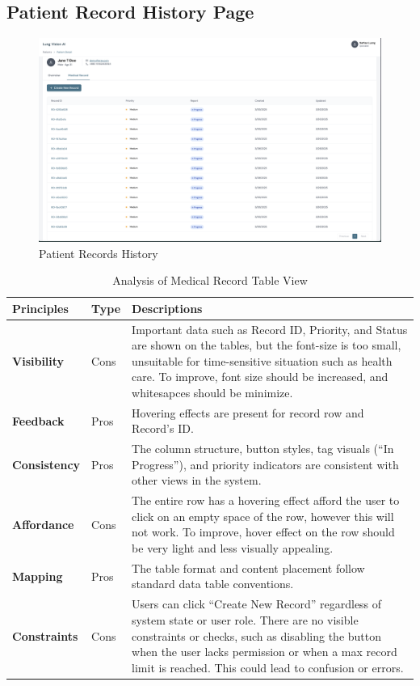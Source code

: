 \documentclass[12pt, titlepage]{article}
\begin{document}
\newpage
\subsection{Patient Record History Page}
  \begin{figure}[ht!] 
    \centering
    \includegraphics[scale=0.25]{../../assets/patient_records.png}
    \caption{Patient Records History}
    \label{fig:patient_records}
  \end{figure}

\begin{table}[h!]
    \centering
    \begin{tabular}{|p{2.5cm}|p{1.5cm}|p{11cm}|}
    \hline
    \rowcolor{gray!30}
    \textbf{Principles} & \textbf{Type} & \textbf{Descriptions} \\
    \hline
    \textbf{Visibility} & Cons & Important data such as Record ID, Priority, and Status are shown on the tables, but the font-size is too small, unsuitable for time-sensitive situation such as health care. To improve, font size should be increased, and whitesapces should be minimize. \\
    \hline
    \textbf{Feedback} & Pros & Hovering effects are present for record row and Record's ID.\\
    \hline
    \textbf{Consistency} & Pros & The column structure, button styles, tag visuals (“In Progress”), and priority indicators are consistent with other views in the system. \\
    \hline
    \textbf{Affordance} & Cons & The entire row has a hovering effect afford the user to click on an empty space of the row, however this will not work. To improve, hover effect on the row should be very light and less visually appealing. \\
    \hline
    \textbf{Mapping} & Pros & The table format and content placement follow standard data table conventions. \\
    \hline
    \textbf{Constraints} & Cons & Users can click “Create New Record” regardless of system state or user role. There are no visible constraints or checks, such as disabling the button when the user lacks permission or when a max record limit is reached. This could lead to confusion or errors. \\
    \hline
    \end{tabular}
    \caption{Analysis of Medical Record Table View}
\end{table}
\end{document}
